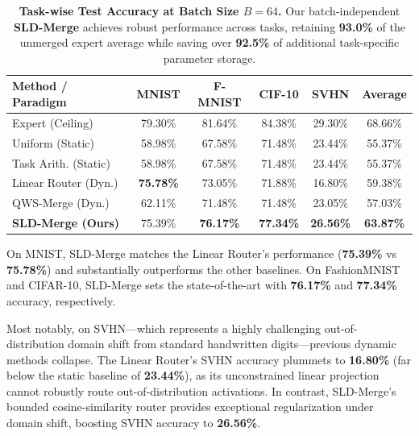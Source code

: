 \begin{table}[t]
\caption{\textbf{Task-wise Test Accuracy at Batch Size $B=64$.} Our batch-independent \textbf{SLD-Merge} achieves robust performance across tasks, retaining \textbf{93.0\%} of the unmerged expert average while saving over \textbf{92.5\%} of additional task-specific parameter storage.}
\label{tab:taskwise_accuracy}
\vskip 0.15in
\begin{center}
\begin{small}
\begin{sc}
\setlength{\tabcolsep}{3pt}
\begin{tabular}{lccccc}
\toprule
Method / Paradigm & MNIST & F-MNIST & CIF-10 & SVHN & Average \\
\midrule
Expert (Ceiling) & 79.30\% & 81.64\% & 84.38\% & 29.30\% & 68.66\% \\
\midrule
Uniform (Static)   & 58.98\% & 67.58\% & 71.48\% & 23.44\% & 55.37\% \\
Task Arith. (Static)   & 58.98\% & 67.58\% & 71.48\% & 23.44\% & 55.37\% \\
Linear Router (Dyn.)    & \textbf{75.78\%} & 73.05\% & 71.88\% & 16.80\% & 59.38\% \\
QWS-Merge (Dyn.)        & 62.11\% & 71.48\% & 71.48\% & 23.05\% & 57.03\% \\
\textbf{SLD-Merge (Ours)} & 75.39\% & \textbf{76.17\%} & \textbf{77.34\%} & \textbf{26.56\%} & \textbf{63.87\%} \\
\bottomrule
\end{tabular}
\end{sc}
\end{small}
\end{center}
\vskip -0.1in
\end{table}

On MNIST, SLD-Merge matches the Linear Router's performance (\textbf{75.39\%} vs \textbf{75.78\%}) and substantially outperforms the other baselines. On FashionMNIST and CIFAR-10, SLD-Merge sets the state-of-the-art with \textbf{76.17\%} and \textbf{77.34\%} accuracy, respectively. 

Most notably, on SVHN—which represents a highly challenging out-of-distribution domain shift from standard handwritten digits—previous dynamic methods collapse. The Linear Router's SVHN accuracy plummets to \textbf{16.80\%} (far below the static baseline of \textbf{23.44\%}), as its unconstrained linear projection cannot robustly route out-of-distribution activations. In contrast, SLD-Merge's bounded cosine-similarity router provides exceptional regularization under domain shift, boosting SVHN accuracy to \textbf{26.56\%}.

